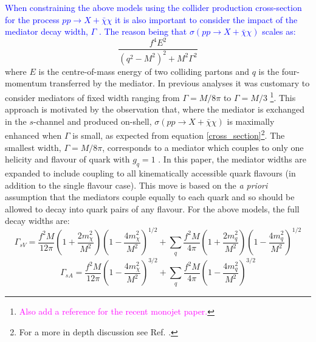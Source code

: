 \begin{flushleft}
\hspace{1cm}\textcolor{blue}{When constraining the above models using the collider production cross-section for the process $pp \rightarrow X + \bar{\chi}\chi$ it is also important to consider the impact of the mediator decay width, $\Gamma$ \cite{}. The reason being that $\sigma\left(pp \rightarrow X + \bar{\chi}\chi\right)$ scales as:}
\begin{equation}
\label{cross_section}
\frac{f^{4}E^{2}}{(q^{2} - M^{2})^{2} + M^2 \Gamma^{2}}
\end{equation}
where $E$ is the centre-of-mass energy of two colliding partons and $q$ is the four-momentum transferred by the mediator.  In previous analyses it was customary to consider mediators of fixed width ranging from $\Gamma = M/8\pi$ to $\Gamma = M/3$ \cite{METSig, Fox:2012ee} \footnote{\textcolor{magenta}{Also add a reference for the recent monojet paper.}}. This approach is motivated by the observation that, where the mediator is exchanged in the $s$-channel and produced on-shell, $\sigma\left(pp \rightarrow X + \bar{\chi}\chi\right)$ is maximally enhanced when $\Gamma$ is small, as expected from equation \ref{cross_section}\footnote{For a more in depth discussion see Ref. \cite{METSig}.}. The smallest width, $\Gamma = M/8\pi$, corresponds to a mediator which couples  to only one helicity and flavour of quark with $g_{q} = 1$ \cite{METSig}. In this paper, the mediator widths are expanded to include coupling to all kinematically accessible quark flavours (in addition to the single flavour case). This move is based on the \emph{a priori} assumption that the mediators couple equally to each quark and so should be allowed to decay into quark pairs of any flavour. For the above models, the full decay widths are:
\begin{equation}
\label{gamma_sV}
\Gamma_{sV} = \frac{f^{2} M}{12\pi}\left(1 + \frac{2m_{\chi}^{2}}{M^{2}}\right)\left(1 - \frac{4m_{\chi}^{2}}{M^{2}}\right)^{1/2} + \sum_{\substack{q}}\frac{f^{2}M}{4\pi}\left(1 + \frac{2m_{q}^{2}}{M^{2}}\right)\left(1 - \frac{4m_{q}^{2}}{M^{2}}\right)^{1/2}
\end{equation}
\begin{equation}
\label{gamma_sA}
\Gamma_{sA} = \frac{f^{2} M}{12\pi}\left(1 - \frac{4m_{\chi}^{2}}{M^{2}}\right)^{3/2} + \sum_{\substack{q}}\frac{f^{2} M}{4\pi}\left(1 - \frac{4m_{q}^{2}}{M^{2}}\right)^{3/2}

\end{equation}
\end{flushleft}
